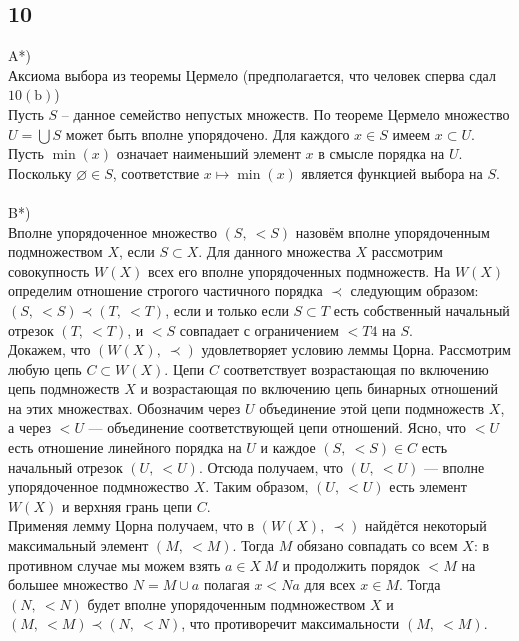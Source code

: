		\subsection{10}
		A*)\\
		Аксиома выбора из теоремы Цермело (предполагается, что человек сперва сдал $10(\text{b})$)\\
		Пусть $S$ -- данное семейство непустых множеств. По теореме Цермело множество $U = \bigcup S$ может быть вполне упорядочено. Для каждого $x \in S$ имеем $x \subset U$. Пусть $\min(x)$ означает наименьший элемент $x$ в смысле порядка на $U$. Поскольку $\varnothing \in S$, соответствие $x \mapsto \min(x)$ является функцией выбора на $S$.
		\\ \\
		B*)\\
		Вполне упорядоченное множество $(S,\: <S)$ назовём вполне упорядоченным подмножеством $X$, если $S \subset X$. Для данного множества $X$ рассмотрим совокупность $W(X)$ всех его вполне упорядоченных подмножеств. На $W(X)$ определим отношение строгого частичного порядка $\prec$ следующим образом:\\
		$(S,\: <S) \prec (T,\: <T )$, если и только если $S \subset T$ есть собственный начальный отрезок $(T,\: <T )$, и $<S$ совпадает с ограничением $<T4$ на $S$.\\
		Докажем, что $(W(X),\: \prec)$ удовлетворяет условию леммы Цорна. Рассмотрим любую цепь $C \subset W(X)$. Цепи $C$ соответствует возрастающая по включению цепь подмножеств $X$ и возрастающая по включению цепь бинарных отношений на этих множествах. Обозначим через $U$ объединение этой цепи подмножеств $X$, а через $<U$ — объединение соответствующей цепи отношений. Ясно, что $<U$ есть отношение линейного порядка на $U$ и каждое $(S,\: <S) \in C$ есть начальный отрезок $(U,\: <U)$. Отсюда получаем, что $(U,\: <U )$ — вполне упорядоченное подмножество $X$. Таким образом, $(U,\: <U )$ есть элемент $W(X)$ и верхняя грань цепи $C$.\\
		Применяя лемму Цорна получаем, что в $(W(X),\: \prec)$ найдётся некоторый максимальный элемент $(M,\: <M)$. Тогда $M$ обязано совпадать со всем $X$: в противном случае мы можем взять $a \in X \ M$ и продолжить порядок $<M$ на большее множество $N = M \cup {a}$ полагая $x <N a$ для всех $x \in M$. Тогда $(N,\: <N)$ будет вполне упорядоченным подмножеством $X$ и $(M,\: <M) \prec (N,\: <N )$, что противоречит максимальности $(M,\: <M)$.
		\\ \\